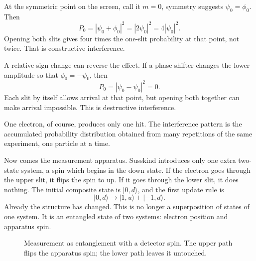 At the symmetric point on the screen, call it \(m=0\), symmetry suggests \(\psi_0=\phi_0\). Then
\begin{equation}
P_0 = |\psi_0+\phi_0|^2 = |2\psi_0|^2 = 4|\psi_0|^2.
\end{equation}
Opening both slits gives four times the one-slit probability at that point, not twice. That is constructive interference.

A relative sign change can reverse the effect. If a phase shifter changes the lower amplitude so that \(\phi_0=-\psi_0\), then
\begin{equation}
P_0 = |\psi_0-\psi_0|^2 = 0.
\end{equation}
Each slit by itself allows arrival at that point, but opening both together can make arrival impossible. This is destructive interference.

One electron, of course, produces only one hit. The interference pattern is the accumulated probability distribution obtained from many repetitions of the same experiment, one particle at a time.

Now comes the measurement apparatus. Susskind introduces only one extra two-state system, a spin which begins in the down state. If the electron goes through the upper slit, it flips the spin to up. If it goes through the lower slit, it does nothing. The initial composite state is \(|0,d\rangle\), and the first update rule is
\begin{equation}
|0,d\rangle \longrightarrow |1,u\rangle + |-1,d\rangle.
\end{equation}
Already the structure has changed. This is no longer a superposition of states of one system. It is an entangled state of two systems: electron position and apparatus spin.

\begin{figure}[htbp]
\centering
{}
\caption{Measurement as entanglement with a detector spin. The upper path flips the apparatus spin; the lower path leaves it untouched.}
\end{figure}

